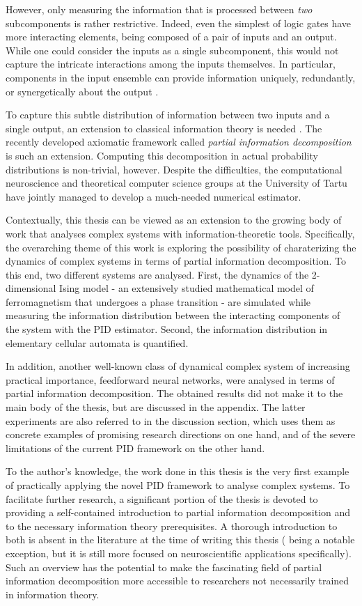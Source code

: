 \documentclass[12pt]{article}
\begin{document}
However, only measuring the information that is processed between \textit{two} subcomponents is rather restrictive. Indeed, even the simplest of logic gates have more interacting elements, being composed of a pair of inputs and an output. While one could consider the inputs as a single subcomponent, this would not capture the intricate interactions among the inputs themselves. In particular, components in the input ensemble can provide information uniquely, redundantly, or synergetically about the output \cite{williams-beer}.  

To capture this subtle distribution of information between two inputs and a single output, an extension to classical information theory is needed \cite{williams-beer}. The recently developed axiomatic framework called \textit{partial information decomposition} \cite{bertschinger} is such an extension. Computing this decomposition in actual probability distributions is non-trivial, however. Despite the difficulties, the computational neuroscience and theoretical computer science groups at the University of Tartu have jointly managed to develop a much-needed numerical estimator. 

Contextually, this thesis can be viewed as an extension to the growing body of work that analyses complex systems with information-theoretic tools. Specifically, the overarching theme of this work is exploring the possibility of charaterizing the dynamics of complex systems in terms of partial information decomposition. To this end, two different systems are analysed. First, the dynamics of the 2-dimensional Ising model - an extensively studied mathematical model of ferromagnetism that undergoes a phase transition - are simulated while measuring the information distribution between the interacting components of the system with the PID estimator. Second, the information distribution in elementary cellular automata is quantified.

In addition, another well-known class of dynamical complex system of increasing practical importance, feedforward neural networks,  were analysed in terms of partial information decomposition. The obtained results did not make it to the main body of the thesis, but are discussed in the appendix. The latter experiments are also referred to in the discussion section, which uses them as concrete examples of promising research directions on one hand, and of the severe limitations of the current PID framework on the other hand. 

To the author's knowledge, the work done in this thesis is the very first example of practically applying the novel PID framework to analyse complex systems. To facilitate further research, a significant portion of the thesis is devoted to providing a self-contained introduction to partial information decomposition and to the necessary information theory prerequisites. A thorough introduction to both is absent in the literature at the time of writing this thesis (\cite{bits-from-brains} being a notable exception, but it is still more focused on neuroscientific applications specifically). Such an overview has the potential to make the fascinating field of partial information decomposition more accessible to researchers not necessarily trained in information theory.  
\end{document}
